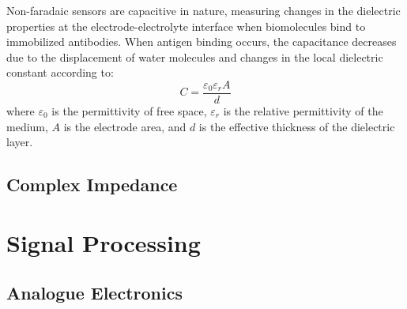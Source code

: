 Non-faradaic sensors are capacitive in nature, measuring changes in the dielectric properties at the electrode-electrolyte interface when biomolecules bind to immobilized antibodies. When antigen binding occurs, the capacitance decreases due to the displacement of water molecules and changes in the local dielectric constant according to:
\begin{equation}
    C = \frac{\varepsilon_0 \varepsilon_r A}{d}
\end{equation}
where $\varepsilon_0$ is the permittivity of free space, $\varepsilon_r$ is the relative permittivity of the medium, $A$ is the electrode area, and $d$ is the effective thickness of the dielectric layer.\cite{bergveldThirtyYearsBiosensor2003}


\subsection{Complex Impedance}

\section{Signal Processing}

\subsection{Analogue Electronics}


